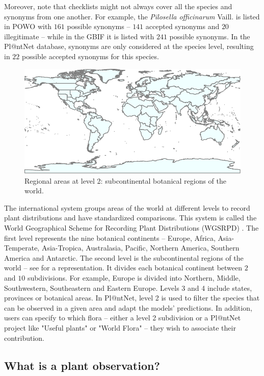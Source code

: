 Moreover, note that checklists might not always cover all the species and synonyms from one another.
For example, the \emph{Pilosella officinarum} Vaill. is listed in POWO with $161$ possible synonyms  -- $141$ accepted synonyms and $20$ illegitimate -- while in the GBIF it is listed with $241$ possible synonyms.
In the Pl@ntNet database, synonyms are only considered at the species level, resulting in $22$ possible accepted synonyms for this species.

\begin{figure}[tbh]
        \centering
        \includegraphics[width=.95\textwidth]{./images_plantnet/level2.pdf}
        \caption{Regional areas at level 2: subcontinental botanical regions of the world.  }
        \label{fig:level2}
\end{figure}

The international system groups areas of the world at different levels to record plant distributions and have standardized comparisons. This system is called the World Geographical Scheme for Recording Plant Distributions (WGSRPD) \citep{brummitt2001world}. The first level represents the nine botanical continents -- Europe, Africa, Asia-Temperate, Asia-Tropica, Australasia, Pacific, Northern America, Southern America and Antarctic.
The second level is the subcontinental regions of the world -- see  for a representation. It divides each botanical continent between $2$ and $10$ subdivisions. For example, Europe is divided into Northern, Middle, Southwestern, Southeastern and Eastern Europe.
Levels 3 and 4 include states, provinces or botanical areas.
In Pl@ntNet, level 2 is used to filter the species that can be observed in a given area and adapt the models' predictions.
In addition, users can specify to which flora -- either a level 2 subdivision or a Pl@ntNet project like "Useful plants" or "World Flora" -- they wish to associate their contribution.

\subsection{What is a plant observation?}
\label{sub:obs_plantnet_what}

